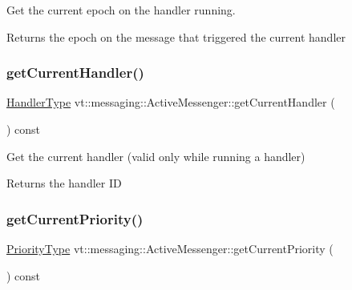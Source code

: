 Get the current epoch on the handler running. 

\begin{DoxyReturn}{Returns}
the epoch on the message that triggered the current handler 
\end{DoxyReturn}
\mbox{\label{structvt_1_1messaging_1_1_active_messenger_a80753933950fa9619a5b675e5db291ad}} 
\subsubsection{\texorpdfstring{get\+Current\+Handler()}{getCurrentHandler()}}
{\footnotesize\ttfamily \hyperlink{namespacevt_af64846b57dfcaf104da3ef6967917573}{Handler\+Type} vt\+::messaging\+::\+Active\+Messenger\+::get\+Current\+Handler (\begin{DoxyParamCaption}{ }\end{DoxyParamCaption}) const}



Get the current handler (valid only while running a handler) 

\begin{DoxyReturn}{Returns}
the handler ID 
\end{DoxyReturn}
\mbox{\label{structvt_1_1messaging_1_1_active_messenger_a170f37d23b8cad11dac0de0dec556ef6}} 
\subsubsection{\texorpdfstring{get\+Current\+Priority()}{getCurrentPriority()}}
{\footnotesize\ttfamily \hyperlink{namespacevt_a86bff9f556eb761b27fc8600d006ac04}{Priority\+Type} vt\+::messaging\+::\+Active\+Messenger\+::get\+Current\+Priority (\begin{DoxyParamCaption}{ }\end{DoxyParamCaption}) const}



